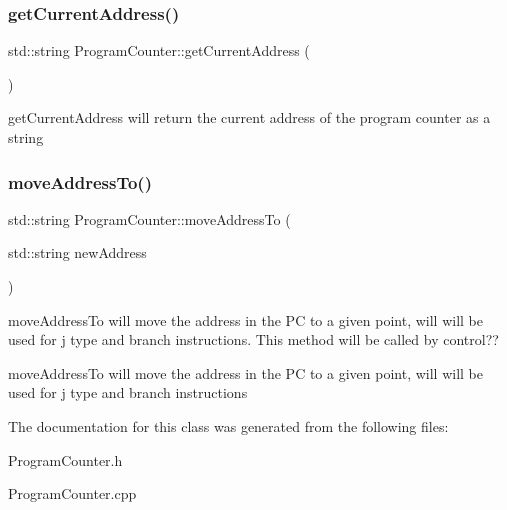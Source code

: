 \subsubsection{\texorpdfstring{get\+Current\+Address()}{getCurrentAddress()}}
{\footnotesize\ttfamily std\+::string Program\+Counter\+::get\+Current\+Address (\begin{DoxyParamCaption}{ }\end{DoxyParamCaption})}

get\+Current\+Address will return the current address of the program counter as a string \mbox{\label{class_program_counter_ac2587f6e388a7176d4e2dde5231924e0}} 
\subsubsection{\texorpdfstring{move\+Address\+To()}{moveAddressTo()}}
{\footnotesize\ttfamily std\+::string Program\+Counter\+::move\+Address\+To (\begin{DoxyParamCaption}\item[{std\+::string}]{new\+Address }\end{DoxyParamCaption})}

move\+Address\+To will move the address in the PC to a given point, will will be used for j type and branch instructions. This method will be called by control??

move\+Address\+To will move the address in the PC to a given point, will will be used for j type and branch instructions 

The documentation for this class was generated from the following files\+:\begin{DoxyCompactItemize}
\item 
Program\+Counter.\+h\item 
Program\+Counter.\+cpp\end{DoxyCompactItemize}
